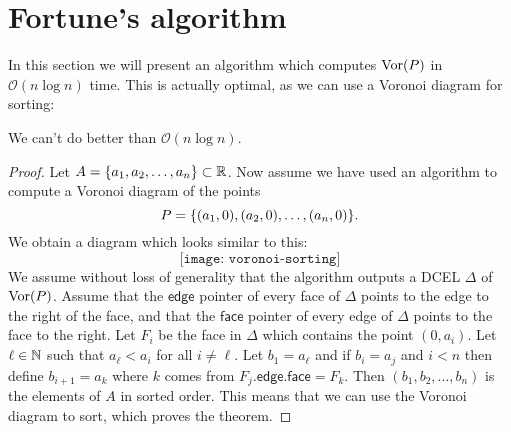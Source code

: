 \section{Fortune's algorithm}
In this section we will present an algorithm which computes $\operatorname{Vor}(P)$ in $\mathcal{O}(n \log n)$ time. This is actually optimal, as we can use a Voronoi diagram for sorting:
\begin{thm} \label{thm:voronoicansort}
We can't do better than $\mathcal{O}(n \log n)$.
\end{thm}
\begin{proof}
Let $A = \{a_1, a_2, \ldots, a_n\} \subset \mathbb{R}$. Now assume we have used an algorithm to compute a Voronoi diagram of the points
\[
    P = \{(a_1, 0), (a_2, 0), \ldots, (a_n, 0)\}.
\]
We obtain a diagram which looks similar to this:
\[
    \texttt{[image: voronoi-sorting]}
\]
We assume without loss of generality that the algorithm outputs a DCEL $\Delta$ of $\operatorname{Vor}(P)$. Assume that the $\textsf{edge}$ pointer of every face of $\Delta$ points to the edge to the right of the face, and that the $\textsf{face}$ pointer of every edge of $\Delta$ points to the face to the right. Let $F_i$ be the face in $\Delta$ which contains the point $(0, a_i)$. Let $\ell \in \mathbb{N}$ such that $a_{\ell} < a_i$ for all $i \ne \ell$. Let $b_1 = a_{\ell}$ and if $b_i = a_{j}$ and $i < n$ then define $b_{i+1} = a_k$ where $k$ comes from $F_{j}\textsf{.edge.face} = F_k$. Then $(b_1, b_2, \ldots, b_n)$ is the elements of $A$ in sorted order. This means that we can use the Voronoi diagram to sort, which proves the theorem.
\end{proof}

